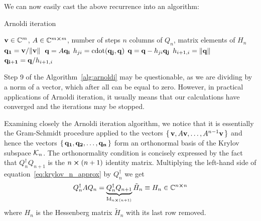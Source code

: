 We can now easily cast the above recurrence into an algorithm:
\begin{algorithm}[H]
	\algrenewcommand{}
	\algrenewcommand{}
	\caption{Arnoldi iteration}
	\label{alg:arnoldi}
	\begin{algorithmic}[1]
		\Require \(\vectorbold{v} \in \CC^m\), \(A \in \mathbb{C}^{m\cross m}\), number of steps \(n\)
		\Ensure columns of \(Q_n\), matrix elements of \(H_n\)
		\State \(\vectorbold{q_1} = \vectorbold{v}/\norm*{\vectorbold{v}}\) 
		\State \(\vectorbold{q} = A\vectorbold{q_i}\)
		\State \(h_{ji} = \mathrm{cdot}(\vectorbold{q_j},\vectorbold{q})\) 
		\State \(\vectorbold{q} = \vectorbold{q} - h_{ji}\vectorbold{q_j}\) 
		\EndFor
		\State \(h_{i+1,i} = \norm{\vectorbold{q}} \)
		\State \(\vectorbold{q_{i+1}} = \vectorbold{q}/h_{i+1,i} \)
		\EndFor
	\end{algorithmic}
\end{algorithm}

Step 9 of the Algorithm~\ref{alg:arnoldi} may be questionable, as we are dividing by a norm of a vector, which
after all can be equal to zero. However, in practical applications of Arnoldi iteration, it usually means
that our calculations have converged and the iterations may be stopped.


Examining closely the Arnoldi iteration algorithm, we notice that it is essentially the Gram-Schmidt
procedure applied to the vectors \(\{\,\vectorbold{v}, A\vectorbold{v},\ldots, A^{n-1}\vectorbold{v}\,\}\) and hence the
vectors \(\{\,\vectorbold{q_1}, \vectorbold{q_2},\ldots,\vectorbold{q_n}\,\}\) form an orthonormal basis
of the Krylov subspace \(\mathcal{K}_{n}\). The orthonormality condition is concisely expressed by
the fact that \(Q^{\dagger}_n Q_{n+1} \) is the \(n\cross (n+1)\) identity matrix. Multiplying the left-hand side of
equation~\eqref{eq:krylov_n_approx} by \(Q^{\dagger}_n\) we get
\begin{equation}
	Q^{\dagger}_n A Q_n = \underbrace{Q^{\dagger}_n Q_{n+1}}_{\mathrm{Id}_{n\cross(n+1)}}\tilde{H}_n \equiv  H_n \in \mathbb{C}^{n\cross n}
	\label{eq:hessenberg}
\end{equation}
where \(H_n\) is the Hessenberg matrix \(\tilde{H}_n\) with its last row removed.

